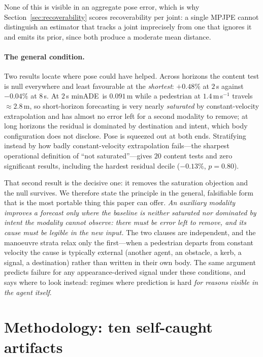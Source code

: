 \documentclass{article} %
\newcommand{\minADE}{minADE\xspace}
\begin{document}
None of this is visible in an aggregate pose error, which is why
Section~\ref{sec:recoverability} scores recoverability per joint: a single MPJPE
cannot distinguish an estimator that tracks a joint imprecisely from one that
ignores it and emits its prior, since both produce a moderate mean distance.

\paragraph{The general condition.}
Two results locate where pose could have helped. Across horizons the content test
is null everywhere and least favourable at the \emph{shortest}: $+0.48\%$ at
$2$\,s against $-0.04\%$ at $8$\,s. At $2$\,s \minADE\ is $0.091$\,m while a
pedestrian at $1.4$\,m\,s$^{-1}$ travels ${\approx}2.8$\,m, so short-horizon
forecasting is very nearly \emph{saturated} by constant-velocity extrapolation and
has almost no error left for a second modality to remove; at long horizons the
residual is dominated by destination and intent, which body configuration does not
disclose. Pose is squeezed out at both ends. Stratifying instead by how badly
constant-velocity extrapolation fails---the sharpest operational definition of
``not saturated''---gives $20$ content tests and zero significant results,
including the hardest residual decile ($-0.13\%$, $p{=}0.80$).

That second result is the decisive one: it removes the saturation objection and the
null survives. We therefore state the principle in the general, falsifiable form
that is the most portable thing this paper can offer. \emph{An auxiliary modality
improves a forecast only where the baseline is neither saturated nor dominated by
intent the modality cannot observe: there must be error left to remove, and its
cause must be legible in the new input.} The two clauses are independent, and the
manoeuvre strata relax only the first---when a pedestrian departs from constant
velocity the cause is typically external (another agent, an obstacle, a kerb, a
signal, a destination) rather than written in their own body. The same argument
predicts failure for any appearance-derived signal under these conditions, and
says where to look instead: regimes where prediction is hard \emph{for reasons
visible in the agent itself}.

\section{Methodology: ten self-caught artifacts}
\label{sec:methodology}
\end{document}

